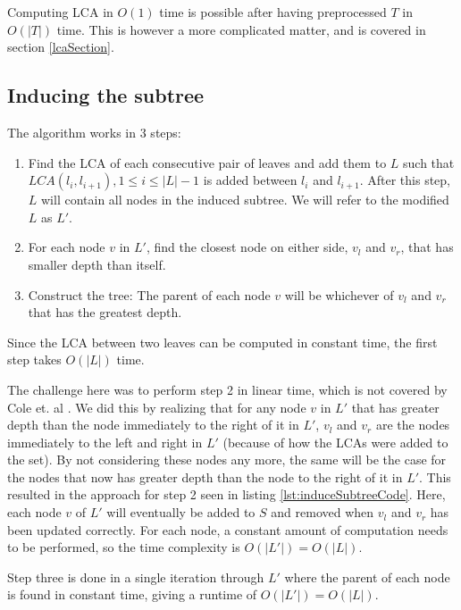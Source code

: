 Computing LCA in $O(1)$ time is possible after having preprocessed $T$ in $O(|T|)$ time. This is however a more complicated matter, and is covered in section \ref{lcaSection}.

\subsection{Inducing the subtree}
The algorithm works in 3 steps:
\begin{enumerate}
	\item Find the LCA of each consecutive pair of leaves and add them to $L$ such that $LCA(l_i,l_{i+1}), 1 \le i \le |L|-1$ is added between $l_i$ and $l_{i+1}$.
	\subitem After this step, $L$ will contain all nodes in the induced subtree.
	\subitem We will refer to the modified $L$ as $L'$.
	\item For each node $v$ in $L'$, find the closest node on either side, $v_l$ and $v_r$, that has smaller depth than itself.
	\item Construct the tree: The parent of each node $v$ will be whichever of $v_l$ and $v_r$ that has the greatest depth.
\end{enumerate}

Since the LCA between two leaves can be computed in constant time, the first step takes $O(|L|)$ time.

The challenge here was to perform step 2 in linear time, which is not covered by Cole et. al \cite{nlogn}. We did this by realizing that for any node $v$ in $L'$ that has greater depth than the node immediately to the right of it in $L'$, $v_l$ and $v_r$ are the nodes immediately to the left and right in $L'$ (because of how the LCAs were added to the set). By not considering these nodes any more, the same will be the case for the nodes that now has greater depth than the node to the right of it in $L'$. This resulted in the approach for step 2 seen in listing \ref{lst:induceSubtreeCode}. Here, each node $v$ of $L'$ will eventually be added to $S$ and removed when $v_l$ and $v_r$ has been updated correctly. For each node, a constant amount of computation needs to be performed, so the time complexity is $O(|L'|) = O(|L|)$.

Step three is done in a single iteration through $L'$ where the parent of each node is found in constant time, giving a runtime of $O(|L'|) = O(|L|)$.

